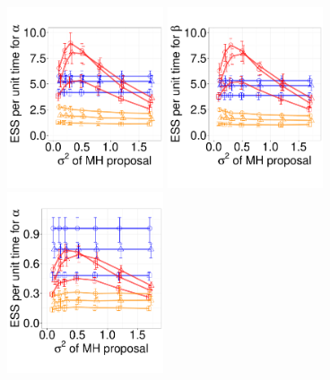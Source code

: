 {%
  \begin{figure}%
  \centering
  \begin{minipage}[hp]{0.99\linewidth}
  \centering
    \includegraphics [width=0.41\textwidth, angle=0]{figs/q_3_alpha.pdf}
    \includegraphics [width=0.41\textwidth, angle=0]{figs/q_3_beta.pdf}
    \vspace{-.1 in}
  \centering
    \includegraphics [width=0.41\textwidth, angle=0]{figs/q_10_alpha.pdf}

\end{minipage}
\end{figure}}
